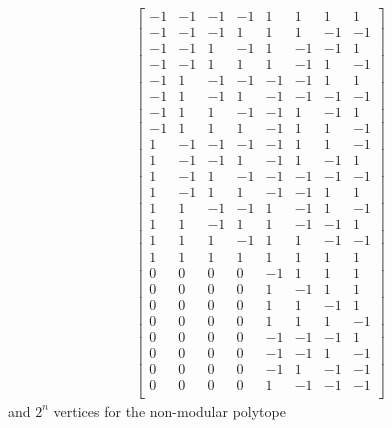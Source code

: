 \documentclass[10pt]{article}
\begin{document}
\begin{equation}
\begin{aligned}\label{eq:modvertexp}
\begin{bmatrix}
  -1 & -1 & -1 & -1 & 1 & 1 & 1 & 1\\
  -1 & -1 & -1 & 1 & 1 & 1 & -1 & -1\\
  -1 & -1 & 1 & -1 & 1 & -1 & -1 & 1\\
  -1 & -1 & 1 & 1 & 1 & -1 & 1 & -1\\
  -1 & 1 & -1 & -1 & -1 & -1 & 1 & 1\\
  -1 & 1 & -1 & 1 & -1 & -1 & -1 & -1\\
  -1 & 1 & 1 & -1 & -1 & 1 & -1 & 1\\
  -1 & 1 & 1 & 1 & -1 & 1 & 1 & -1\\
  1 & -1 & -1 & -1 & -1 & 1 & 1 & -1\\
  1 & -1 & -1 & 1 & -1 & 1 & -1 & 1\\
  1 & -1 & 1 & -1 & -1 & -1 & -1 & -1\\
  1 & -1 & 1 & 1 & -1 & -1 & 1 & 1\\
  1 & 1 & -1 & -1 & 1 & -1 & 1 & -1\\
  1 & 1 & -1 & 1 & 1 & -1 & -1 & 1\\
  1 & 1 & 1 & -1 & 1 & 1 & -1 & -1\\
  1 & 1 & 1 & 1 & 1 & 1 & 1 & 1\\
  0 & 0 & 0 & 0 & -1 & 1 & 1 & 1\\
  0 & 0 & 0 & 0 & 1 & -1 & 1 & 1\\
  0 & 0 & 0 & 0 & 1 & 1 & -1 & 1\\
  0 & 0 & 0 & 0 & 1 & 1 & 1 & -1\\
  0 & 0 & 0 & 0 & -1 & -1 & -1 & 1\\
  0 & 0 & 0 & 0 & -1 & -1 & 1 & -1\\
  0 & 0 & 0 & 0 & -1 & 1 & -1 & -1\\
  0 & 0 & 0 & 0 & 1 & -1 & -1 & -1\\
\end{bmatrix}
\end{aligned}
\end{equation}
and $2^n$ vertices for the non-modular polytope
\end{document}

